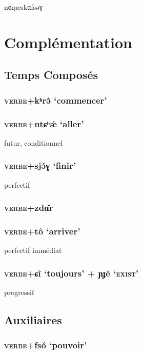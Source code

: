 \documentclass[11pt, a4paper]{book}              %
\newcommand{\ipa}[1]{{\phon \mbox{#1}}} %
\begin{document}
\ipa{nɑŋæskɑfsəɣ}


\chapter{Complémentation}


\section{Temps Composés}



\subsection{\textsc{verbe}+\ipa{kʰrə̂} `commencer'}

\subsection{\textsc{verbe}+\ipa{ntɕʰǽ} `aller'}

futur, conditionnel

\subsection{\textsc{verbe}+\ipa{sjə́ɣ} `finir'}

perfectif

\subsection{\textsc{verbe}+\ipa{zdɑ̂r}}

\subsection{\textsc{verbe}+\ipa{tô} `arriver'}

perfectif immédiat

\subsection{\textsc{verbe}+\ipa{ɕî} `toujours' + \ipa{ɲɟê} `\textsc{exist}'}

progressif

\section{Auxiliaires}

\subsection{\textsc{verbe}+\ipa{fsó} `pouvoir'}
\end{document}
